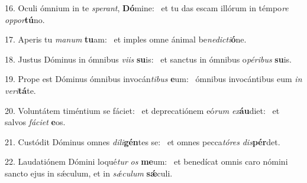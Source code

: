 16. Oculi ómnium in te \textit{spe}\textit{rant}, \textbf{Dó}mine: \ast\  et tu das escam illórum in témpo\textit{re} \textit{op}\textit{por}\textbf{tú}no.\

17. Aperis tu \textit{ma}\textit{num} \textbf{tu}am: \ast\  et imples omne ánimal be\textit{ne}\textit{dic}\textit{ti}\textbf{ó}ne.\

18. Justus Dóminus in ómnibus \textit{vi}\textit{is} \textbf{su}is: \ast\  et sanctus in ómnibus o\textit{pé}\textit{ri}\textit{bus} \textbf{su}is.\

19. Prope est Dóminus ómnibus invocán\textit{ti}\textit{bus} \textbf{e}um: \ast\  ómnibus invocántibus eum \textit{in} \textit{ve}\textit{ri}\textbf{tá}te.\

20. Voluntátem timéntium se fáciet: \dag\  et deprecatiónem eó\textit{rum} \textit{ex}\textbf{áu}diet: \ast\  et salvos \textit{fá}\textit{ci}\textit{et} \textbf{e}os.\

21. Custódit Dóminus omnes \textit{di}\textit{li}\textbf{gén}tes se: \ast\  et omnes pecca\textit{tó}\textit{res} \textit{dis}\textbf{pér}det.\

22. Laudatiónem Dómini loqué\textit{tur} \textit{os} \textbf{me}um: \ast\  et benedícat omnis caro nómini sancto ejus in sǽculum, et in \textit{sǽ}\textit{cu}\textit{lum} \textbf{sǽ}culi.\

